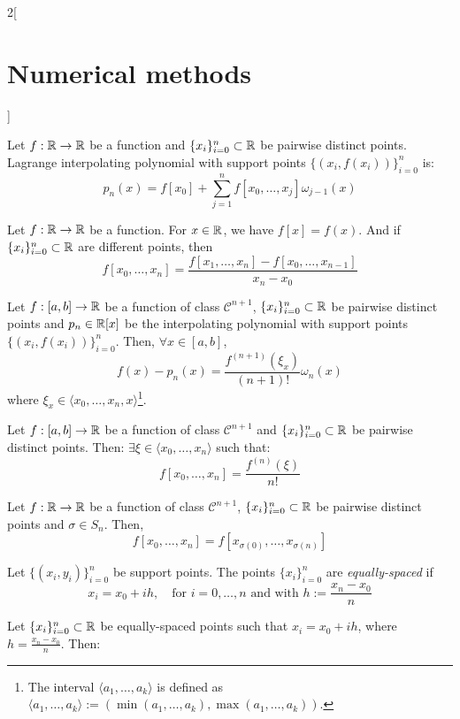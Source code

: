 \documentclass[../../../main.tex]{subfiles}
\begin{document}
\begin{multicols}{2}[\section{Numerical methods}]
\begin{definition}
    \end{definition}
    \begin{prop}
        Let $f:\mathbb{R}\rightarrow\mathbb{R}$ be a function and $\{x_i\}_{i=0}^n\subset\mathbb{R}$ be pairwise distinct points. Lagrange interpolating polynomial with support points $\{(x_i,f(x_i))\}_{i=0}^n$ is: $$p_n(x)=f[x_0]+\sum_{j=1}^nf[x_0,\ldots,x_j]\omega_{j-1}(x)$$
    \end{prop}
    \begin{method}
        Let $f:\mathbb{R}\rightarrow\mathbb{R}$ be a function. For $x\in\mathbb{R}$, we have $f[x]=f(x)$. And if $\{x_i\}_{i=0}^n\subset\mathbb{R}$ are different points, then $$f[x_0,\ldots,x_n]=\frac{f[x_1,\ldots,x_n]-f[x_0,\ldots,x_{n-1}]}{x_n-x_0}$$
    \end{method}
    \begin{theorem}
        Let $f:[a,b]\rightarrow\mathbb{R}$ be a function of class $\mathcal{C}^{n+1}$, $\{x_i\}_{i=0}^n\subset\mathbb{R}$ be pairwise distinct points and $p_n\in\mathbb{R}[x]$ be the interpolating polynomial with support points $\{(x_i,f(x_i))\}_{i=0}^n$. Then, $\forall x\in[a,b]$, $$f(x)-p_n(x)=\frac{f^{(n+1)}(\xi_x)}{(n+1)!}\omega_n(x)$$ where $\xi_x\in\langle x_0,\ldots,x_n,x\rangle$\footnote{The interval $\langle a_1,\ldots,a_k\rangle$ is defined as $\langle a_1,\ldots,a_k\rangle:=(\min(a_1,\ldots,a_k),\max(a_1,\ldots,a_k))$.}.
    \end{theorem}
    \begin{lemma}
        Let $f:[a,b]\rightarrow\mathbb{R}$ be a function of class $\mathcal{C}^{n+1}$ and $\{x_i\}_{i=0}^n\subset\mathbb{R}$ be pairwise distinct points. Then: $\exists\xi\in\langle x_0,\ldots,x_n\rangle$ such that: $$f[x_0,\ldots,x_n]=\frac{f^{(n)}(\xi)}{n!}$$
    \end{lemma}
    \begin{prop}
        Let $f:\mathbb{R}\rightarrow\mathbb{R}$ be a function of class $\mathcal{C}^{n+1}$, $\{x_i\}_{i=0}^n\subset\mathbb{R}$ be pairwise distinct points and $\sigma\in S_n$. Then, $$f[x_0,\ldots,x_n]=f[x_{\sigma(0)},\ldots,x_{\sigma(n)}]$$
    \end{prop}
    \begin{definition}
        Let $\{(x_i,y_i)\}_{i=0}^n$ be support points. The points $\{x_i\}_{i=0}^n$ are \textit{equally-spaced} if $$x_i=x_0+ih,\quad\text{for }i=0,\ldots,n\text{ and with }h:=\frac{x_n-x_0}{n}$$
    \end{definition}
    \begin{prop}
        Let $\{x_i\}_{i=0}^n\subset\mathbb{R}$ be equally-spaced points such that $x_i=x_0+ih$, where $h=\frac{x_n-x_0}{n}$. Then:

\end{prop}
\end{multicols}
\end{document}
